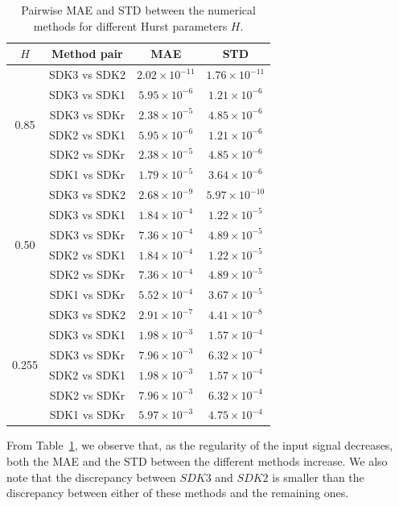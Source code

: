 \documentclass{article}%
\begin{document}
\begin{table}[H]
\centering
\begin{tabular}{c|c|c|c}
\hline
$H$ & Method pair & MAE & STD \\
\hline
\multirow{6}{*}{0.85} 
 & SDK3 vs SDK2 & $2.02\times 10^{-11}$ & $1.76\times 10^{-11}$ \\
 & SDK3 vs SDK1 & $5.95\times 10^{-6}$  & $1.21\times 10^{-6}$ \\
 & SDK3 vs SDKr & $2.38\times 10^{-5}$  & $4.85\times 10^{-6}$ \\
 & SDK2 vs SDK1 & $5.95\times 10^{-6}$  & $1.21\times 10^{-6}$ \\
 & SDK2 vs SDKr & $2.38\times 10^{-5}$  & $4.85\times 10^{-6}$ \\
 & SDK1 vs SDKr & $1.79\times 10^{-5}$  & $3.64\times 10^{-6}$ \\
\hline
\multirow{6}{*}{0.50} 
 & SDK3 vs SDK2 & $2.68\times 10^{-9}$  & $5.97\times 10^{-10}$ \\
 & SDK3 vs SDK1 & $1.84\times 10^{-4}$  & $1.22\times 10^{-5}$ \\
 & SDK3 vs SDKr & $7.36\times 10^{-4}$  & $4.89\times 10^{-5}$ \\
 & SDK2 vs SDK1 & $1.84\times 10^{-4}$  & $1.22\times 10^{-5}$ \\
 & SDK2 vs SDKr & $7.36\times 10^{-4}$  & $4.89\times 10^{-5}$ \\
 & SDK1 vs SDKr & $5.52\times 10^{-4}$  & $3.67\times 10^{-5}$ \\
\hline
\multirow{6}{*}{0.255} 
 & SDK3 vs SDK2 & $2.91\times 10^{-7}$  & $4.41\times 10^{-8}$ \\
 & SDK3 vs SDK1 & $1.98\times 10^{-3}$  & $1.57\times 10^{-4}$ \\
 & SDK3 vs SDKr & $7.96\times 10^{-3}$  & $6.32\times 10^{-4}$ \\
 & SDK2 vs SDK1 & $1.98\times 10^{-3}$  & $1.57\times 10^{-4}$ \\
 & SDK2 vs SDKr & $7.96\times 10^{-3}$  & $6.32\times 10^{-4}$ \\
 & SDK1 vs SDKr & $5.97\times 10^{-3}$  & $4.75\times 10^{-4}$ \\
\hline
\end{tabular}
\caption{Pairwise MAE and STD between the numerical methods for different Hurst parameters \(H\).}
\label{tab:method_errors_updated}
\end{table}

From Table~\ref{tab:method_errors_updated}, we observe that, as the regularity of the input signal decreases, both the MAE and the STD between the different methods increase. We also note that the discrepancy between \(SDK3\) and \(SDK2\) is smaller than the discrepancy between either of these methods and the remaining ones.
\end{document}
